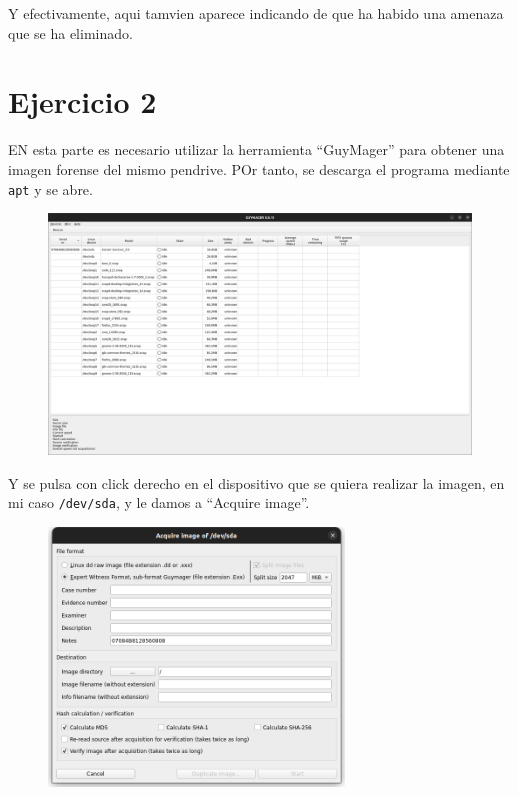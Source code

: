 \documentclass{article}
\begin{document}
Y efectivamente, aqui tamvien aparece indicando de que ha habido una amenaza que se ha eliminado.

\section*{Ejercicio 2}

EN esta parte es necesario utilizar la herramienta ``GuyMager'' para obtener una imagen forense del mismo pendrive. POr tanto, se descarga el programa mediante \verb|apt| y se abre.

\begin{figure}[H]
    \centering
    \includegraphics[width=\textwidth]{imagenes/Captura desde 2022-12-02 19-33-30.png}
\end{figure}

Y se pulsa con click derecho en el dispositivo que se quiera realizar la imagen, en mi caso \verb|/dev/sda|, y le damos a ``Acquire image''.

\begin{figure}[H]
    \centering
    \includegraphics[width=0.7\textwidth]{imagenes/Captura desde 2022-12-02 19-33-37.png}
\end{figure}
\end{document}
